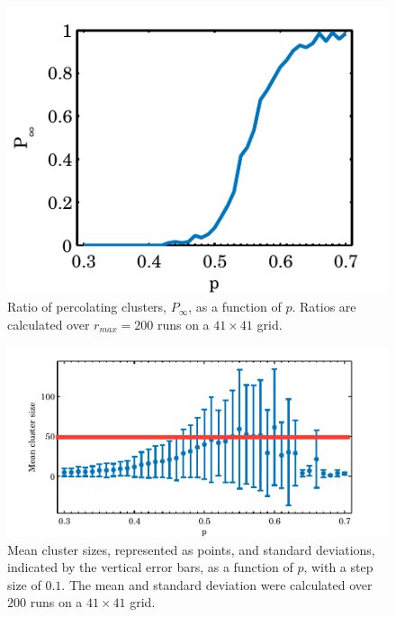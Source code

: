 \begin{figure}[b!]
	\centering
	\includegraphics[width=\columnwidth]{./img/assignment_a_p_infinite_ratio_p.pdf}
	\caption{Ratio of percolating clusters, $P_\infty$, as a function of $p$. Ratios are calculated over $r_{max} = 200$ runs on a $41 \times 41$ grid.}
	\label{fig:experiment:prob:p_inf_ratio}
\end{figure}


\begin{figure}
	\centering
	\includegraphics[width=\textwidth]{./img/assignment_a_mean_std_p.pdf}
	\caption{Mean cluster sizes, represented as points, and standard deviations, indicated by the vertical error bars, as a function of $p$, with a step size of $0.1$. The mean and standard deviation were calculated over $200$ runs on a $41 \times 41$ grid.}
	\label{fig:experiment:prob:mean_std_clusters}
\end{figure}

